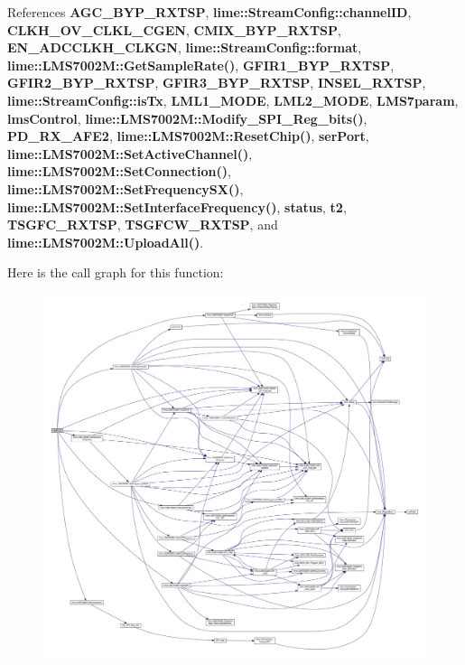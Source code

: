 References {\bf A\+G\+C\+\_\+\+B\+Y\+P\+\_\+\+R\+X\+T\+SP}, {\bf lime\+::\+Stream\+Config\+::channel\+ID}, {\bf C\+L\+K\+H\+\_\+\+O\+V\+\_\+\+C\+L\+K\+L\+\_\+\+C\+G\+EN}, {\bf C\+M\+I\+X\+\_\+\+B\+Y\+P\+\_\+\+R\+X\+T\+SP}, {\bf E\+N\+\_\+\+A\+D\+C\+C\+L\+K\+H\+\_\+\+C\+L\+K\+GN}, {\bf lime\+::\+Stream\+Config\+::format}, {\bf lime\+::\+L\+M\+S7002\+M\+::\+Get\+Sample\+Rate()}, {\bf G\+F\+I\+R1\+\_\+\+B\+Y\+P\+\_\+\+R\+X\+T\+SP}, {\bf G\+F\+I\+R2\+\_\+\+B\+Y\+P\+\_\+\+R\+X\+T\+SP}, {\bf G\+F\+I\+R3\+\_\+\+B\+Y\+P\+\_\+\+R\+X\+T\+SP}, {\bf I\+N\+S\+E\+L\+\_\+\+R\+X\+T\+SP}, {\bf lime\+::\+Stream\+Config\+::is\+Tx}, {\bf L\+M\+L1\+\_\+\+M\+O\+DE}, {\bf L\+M\+L2\+\_\+\+M\+O\+DE}, {\bf L\+M\+S7param}, {\bf lms\+Control}, {\bf lime\+::\+L\+M\+S7002\+M\+::\+Modify\+\_\+\+S\+P\+I\+\_\+\+Reg\+\_\+bits()}, {\bf P\+D\+\_\+\+R\+X\+\_\+\+A\+F\+E2}, {\bf lime\+::\+L\+M\+S7002\+M\+::\+Reset\+Chip()}, {\bf ser\+Port}, {\bf lime\+::\+L\+M\+S7002\+M\+::\+Set\+Active\+Channel()}, {\bf lime\+::\+L\+M\+S7002\+M\+::\+Set\+Connection()}, {\bf lime\+::\+L\+M\+S7002\+M\+::\+Set\+Frequency\+S\+X()}, {\bf lime\+::\+L\+M\+S7002\+M\+::\+Set\+Interface\+Frequency()}, {\bf status}, {\bf t2}, {\bf T\+S\+G\+F\+C\+\_\+\+R\+X\+T\+SP}, {\bf T\+S\+G\+F\+C\+W\+\_\+\+R\+X\+T\+SP}, and {\bf lime\+::\+L\+M\+S7002\+M\+::\+Upload\+All()}.



Here is the call graph for this function\+:
\nopagebreak
\begin{figure}[H]
\begin{center}
\leavevmode
\includegraphics[width=350pt]{df/d7d/streaming_8cpp_a0a2ac36ab3e88fe6fc983102f725176f_cgraph}
\end{center}
\end{figure}


